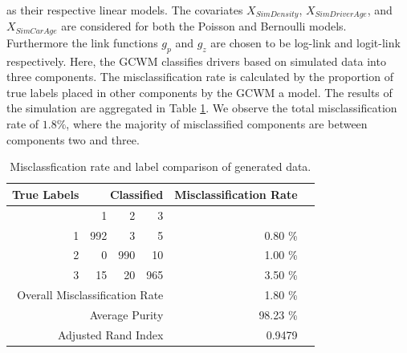 \documentclass[11pt,letterpaper]{article}
\numberwithin{equation}{section}
\numberwithin{equation}{section}
\numberwithin{equation}{section}
\begin{document}
as their respective linear models.  The covariates $X_{SimDensity}$, $X_{SimDriverAge}$, and $X_{SimCarAge}$ are considered for both the Poisson and Bernoulli models. Furthermore the link functions $g_p$ and $g_z$ are chosen to be log-link and logit-link respectively. 
 Here, the GCWM classifies drivers based on simulated data into three components. The misclassification rate is calculated by the proportion of true labels placed in other components by the GCWM a model.  The results of the simulation are aggregated in Table \ref{misclassTable}. We observe the total misclassification rate of $1.8 \% $, where the majority of misclassified components are between components two and three.
\begin{table}[!htb]
\begin{center}
\caption{Misclassfication rate and label comparison of generated data.}
\label{misclassTable}
\begin{tabular}{r| r r r| r r}
\hline
    True Labels       &  \multicolumn{3}{r}{ Classified }  \vline & Misclassification Rate  &  \\ \hline
   & 1                              & 2   & 3   &                            &  \\ \hline
 1              & 992                            & 3   & 5   & 0.80 \%                                      &  \\
 2              & 0                              & 990 & 10  & 1.00 \%                                       &  \\
 3              & 15                             & 20  & 965 & 3.50 \%                                      &  \\  \hline
                \multicolumn{4}{r}{Overall Misclassification Rate}        & 1.80 \%                  & \\
        		\multicolumn{4}{r}{Average Purity} & 98.23 \%  
        		\\ \hline
                \multicolumn{4}{r}{Adjusted Rand Index} & 0.9479 &  \\
    \hline
\end{tabular}
\end{center}
\end{table}
\end{document}
